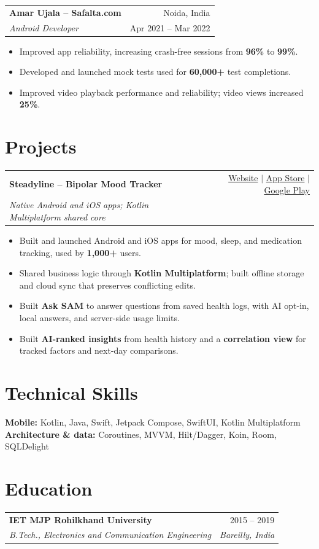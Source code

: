 \documentclass[letterpaper,12pt]{article}
\makeatletter
\renewcommand{\small}{\fontsize{11}{13}\selectfont}
\newcommand{\metric}[1]{\textbf{#1}}
\newcommand{\role}[4]{%
  \begin{tabularx}{\textwidth}{@{}X r@{}}
    \textbf{#1} & #2 \\
    \textit{\small #3} & \textit{\small #4}
  \end{tabularx}%
}
\newcommand{\employment}[4]{%
  \begin{tabularx}{\textwidth}{@{}X r@{}}
    \textbf{#3} & {\small #4} \\
    {\small\textit{#1}} & {\small #2}
  \end{tabularx}%
}
\makeatother
\begin{document}
\employment{Android Developer}{Apr 2021 -- Mar 2022}
  {Amar Ujala -- Safalta.com}{Noida, India}
\begin{itemize}
  \item Improved app reliability, increasing crash-free sessions from \metric{96\%} to \metric{99\%}.
  \item Developed and launched mock tests used for \metric{60,000+} test completions.
  \item Improved video playback performance and reliability; video views increased \metric{25\%}.
\end{itemize}\vspace{2pt}

\section{Projects}
\role{Steadyline -- Bipolar Mood Tracker}{\small
  \href{https://steadyline.app}{Website} $|$
  \href{https://apps.apple.com/app/steadyline-bipolar-tracker/id6763089476}{App Store} $|$
  \href{https://play.google.com/store/apps/details?id=com.ravimishra.samapp}{Google Play}}
  {Native Android and iOS apps; Kotlin Multiplatform shared core}{}
\begin{itemize}
  \item Built and launched Android and iOS apps for mood, sleep, and medication tracking, used by \metric{1,000+} users.
  \item Shared business logic through \textbf{Kotlin Multiplatform}; built offline storage and cloud sync that preserves conflicting edits.
  \item Built \textbf{Ask SAM} to answer questions from saved health logs, with AI opt-in, local answers, and server-side usage limits.
  \item Built \textbf{AI-ranked insights} from health history and a \textbf{correlation view} for tracked factors and next-day comparisons.
\end{itemize}\vspace{2pt}

\section{Technical Skills}
\small
\textbf{Mobile:} Kotlin, Java, Swift, Jetpack Compose, SwiftUI, Kotlin Multiplatform\\[2pt]
\textbf{Architecture \& data:} Coroutines, MVVM, Hilt/Dagger, Koin, Room, SQLDelight

\section{Education}
\role{IET MJP Rohilkhand University}{2015 -- 2019}
  {B.Tech., Electronics and Communication Engineering}{Bareilly, India}
\end{document}
